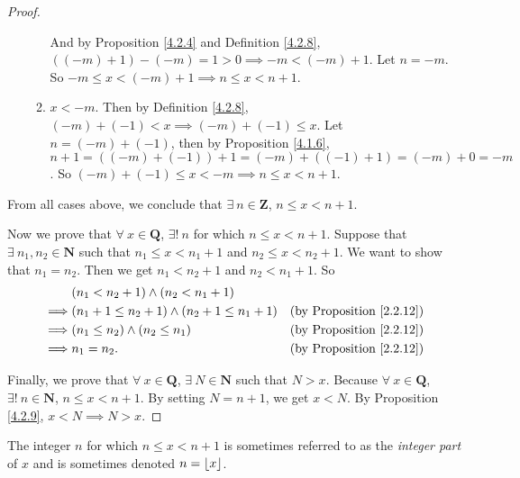 \begin{proof}
\begin{enumerate}
\begin{enumerate}[label=(\roman*)]
                        And by Proposition \ref{4.2.4} and Definition \ref{4.2.8}, \(((-m) + 1) - (-m) = 1 > 0 \implies -m < (-m) + 1\).
                        Let \(n = -m\).
                        So \(-m \leq x < (-m) + 1 \implies n \leq x < n + 1\).
                  \item \(x < -m\).
                        Then by Definition \ref{4.2.8}, \((-m) + (-1) < x \implies (-m) + (-1) \leq x\).
                        Let \(n = (-m) + (-1)\), then by Proposition \ref{4.1.6}, \(n + 1 = ((-m) + (-1)) + 1 = (-m) + ((-1) + 1) = (-m) + 0 = -m\).
                        So \((-m) + (-1) \leq x < -m \implies n \leq x < n + 1\).
              \end{enumerate}
    \end{enumerate}
    From all cases above, we conclude that \(\exists\ n \in \mathbf{Z}\), \(n \leq x < n + 1\).

    Now we prove that \(\forall\ x \in \mathbf{Q}\), \(\exists!\ n\) for which \(n \leq x < n + 1\).
    Suppose that \(\exists\ n_1, n_2 \in \mathbf{N}\) such that \(n_1 \leq x < n_1 + 1\) and \(n_2 \leq x < n_2 + 1\).
    We want to show that \(n_1 = n_2\).
    Then we get \(n_1 < n_2 + 1\) and \(n_2 < n_1 + 1\).
    So
    \begin{align*}
                 & (n_1 < n_2 + 1) \land (n_2 < n_1 + 1)                                                      \\
        \implies & (n_1 + 1 \leq n_2 + 1) \land (n_2 + 1 \leq n_1 + 1) & \text{(by Proposition \ref{2.2.12})} \\
        \implies & (n_1 \leq n_2) \land (n_2 \leq n_1)                 & \text{(by Proposition \ref{2.2.12})} \\
        \implies & n_1 = n_2.                                          & \text{(by Proposition \ref{2.2.12})}
    \end{align*}

    Finally, we prove that \(\forall\ x \in \mathbf{Q}\), \(\exists\ N \in \mathbf{N}\) such that \(N > x\).
    Because \(\forall\ x \in \mathbf{Q}\), \(\exists!\ n \in \mathbf{N}\), \(n \leq x < n + 1\).
    By setting \(N = n + 1\), we get \(x < N\).
    By Proposition \ref{4.2.9}, \(x < N \implies N > x\).
\end{proof}

\begin{remark}\label{4.4.2}
    The integer \(n\) for which \(n \leq x < n + 1\) is sometimes referred to as the \emph{integer part} of \(x\) and is sometimes denoted \(n = \floor*{x}\).
\end{remark}

